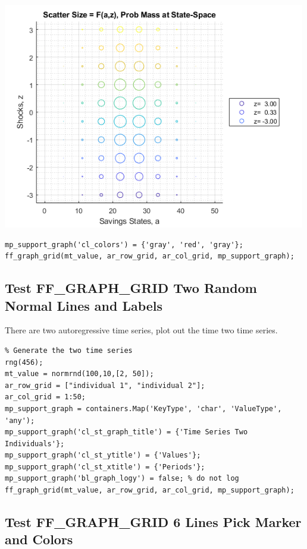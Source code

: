 \documentclass[
]{book}
\begin{document}
\includegraphics[width=5.20833in,height=\textheight]{img/fx_graph_grid_images/figure_8.png}

\begin{verbatim}
mp_support_graph('cl_colors') = {'gray', 'red', 'gray'};
ff_graph_grid(mt_value, ar_row_grid, ar_col_grid, mp_support_graph);
\end{verbatim}

\hypertarget{test-ff_graph_grid-two-random-normal-lines-and-labels}{%
\subsection{Test FF\_GRAPH\_GRID Two Random Normal Lines and Labels}\label{test-ff_graph_grid-two-random-normal-lines-and-labels}}

There are two autoregressive time series, plot out the time two time
series.

\begin{verbatim}
% Generate the two time series
rng(456);
mt_value = normrnd(100,10,[2, 50]);
ar_row_grid = ["individual 1", "individual 2"];
ar_col_grid = 1:50;
mp_support_graph = containers.Map('KeyType', 'char', 'ValueType', 'any');
mp_support_graph('cl_st_graph_title') = {'Time Series Two Individuals'};
mp_support_graph('cl_st_ytitle') = {'Values'};
mp_support_graph('cl_st_xtitle') = {'Periods'};
mp_support_graph('bl_graph_logy') = false; % do not log
ff_graph_grid(mt_value, ar_row_grid, ar_col_grid, mp_support_graph);
\end{verbatim}

\hypertarget{test-ff_graph_grid-6-lines-pick-marker-and-colors}{%
\subsection{Test FF\_GRAPH\_GRID 6 Lines Pick Marker and Colors}\label{test-ff_graph_grid-6-lines-pick-marker-and-colors}}
\end{document}
